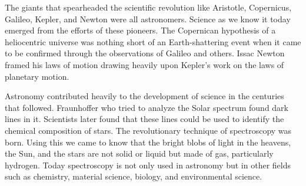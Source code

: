 \documentclass{../template/texnote}
\begin{document}
The giants that spearheaded the scientific revolution like Aristotle, Copernicus, Galileo, Kepler, and Newton were all astronomers. Science as we know it today emerged from the efforts of these pioneers. The Copernican hypothesis of a heliocentric universe was nothing short of an Earth-shattering event when it came to be confirmed through the observations of Galileo and others. Issac Newton framed his laws of motion drawing heavily upon Kepler's work on the laws of planetary motion. 

Astronomy contributed heavily to the development of science in the centuries that followed. Fraunhoffer who tried to analyze the Solar spectrum found dark lines in it. Scientists later found that these lines could be used to identify the chemical composition of stars. The revolutionary technique of spectroscopy was born. Using this we came to know that the bright blobs of light in the heavens, the Sun, and the stars are not solid or liquid but made of gas, particularly hydrogen. Today spectroscopy is not only used in astronomy but in other fields such as chemistry, material science, biology, and environmental science. 



\end{document}
